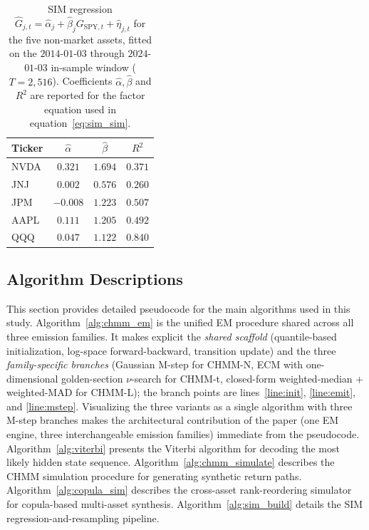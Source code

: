 \begin{table}[H]
\centering
\caption{SIM regression $\hat{G}_{j,t} = \hat{\alpha}_j + \hat{\beta}_j G_{\text{SPY},t} + \hat{\eta}_{j,t}$ for the five non-market assets, fitted on the $2014$-$01$-$03$ through $2024$-$01$-$03$ in-sample window ($T = 2{,}516$). Coefficients $\hat{\alpha}, \hat{\beta}$ and $R^2$ are reported for the factor equation used in equation~\eqref{eq:sim_sim}.}
\label{tab:sim_regression}
\small
\begin{tabular}{l ccc}
\toprule
Ticker & $\hat{\alpha}$ & $\hat{\beta}$ & $R^2$ \\
\midrule
NVDA & $0.321$   & $1.694$ & $0.371$ \\
JNJ  & $0.002$   & $0.576$ & $0.260$ \\
JPM  & $-0.008$  & $1.223$ & $0.507$ \\
AAPL & $0.111$   & $1.205$ & $0.492$ \\
QQQ  & $0.047$   & $1.122$ & $0.840$ \\
\bottomrule
\end{tabular}
\end{table}

\subsection{Algorithm Descriptions}
\label{sec:algorithms}

This section provides detailed pseudocode for the main algorithms used in this study.
Algorithm~\ref{alg:chmm_em} is the unified EM procedure shared across all three emission families.
It makes explicit the \emph{shared scaffold} (quantile-based initialization, log-space forward-backward, transition update) and the three \emph{family-specific branches} (Gaussian M-step for CHMM-N, ECM with one-dimensional golden-section $\nu$-search for CHMM-t, closed-form weighted-median + weighted-MAD for CHMM-L); the branch points are lines~\ref{line:init}, \ref{line:emit}, and \ref{line:mstep}.
Visualizing the three variants as a single algorithm with three M-step branches makes the architectural contribution of the paper (one EM engine, three interchangeable emission families) immediate from the pseudocode.
Algorithm~\ref{alg:viterbi} presents the Viterbi algorithm for decoding the most likely hidden state sequence.
Algorithm~\ref{alg:chmm_simulate} describes the CHMM simulation procedure for generating synthetic return paths.
Algorithm~\ref{alg:copula_sim} describes the cross-asset rank-reordering simulator for copula-based multi-asset synthesis.
Algorithm~\ref{alg:sim_build} details the SIM regression-and-resampling pipeline.

